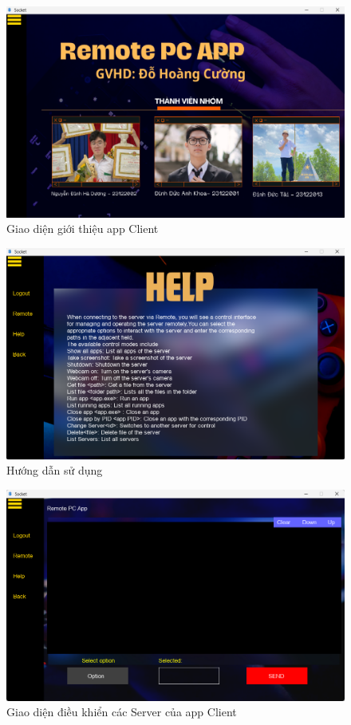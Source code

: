 \begin{figure}[H]
    \centering
    \includegraphics[width=0.93\linewidth]{img/mainpage.png}
    \caption{Giao diện giới thiệu app Client}
\end{figure}

\begin{figure}[H]
    \centering
    \includegraphics[width=0.93\linewidth]{img/help.png}
    \caption{Hướng dẫn sử dụng}
\end{figure}

\begin{figure}[H]
    \centering
    \includegraphics[width=0.93\linewidth]{img/remote.png}
    \caption{Giao diện điều khiển các Server của app Client}
\end{figure}

